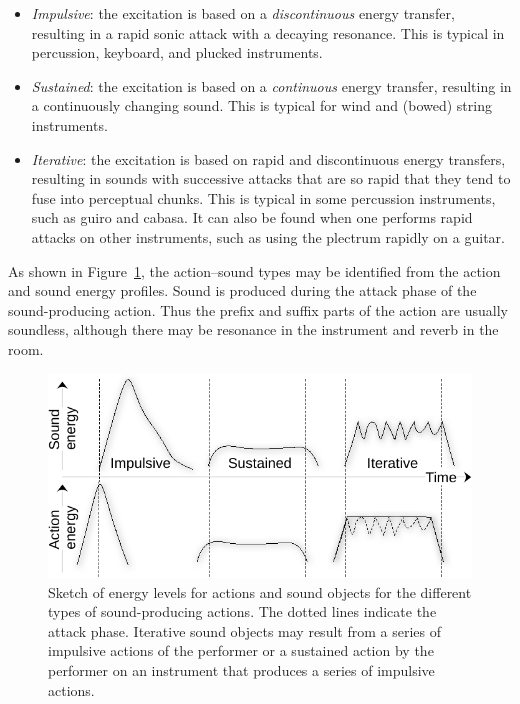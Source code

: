 \begin{itemize}
      \item \emph{Impulsive}: the excitation is based on a \emph{discontinuous} energy transfer, resulting in a rapid sonic attack with a decaying resonance. This is typical in percussion, keyboard, and plucked instruments.
      \item \emph{Sustained}: the excitation is based on a \emph{continuous} energy transfer, resulting in a continuously changing sound. This is typical for wind and (bowed) string instruments.
      \item \emph{Iterative}: the excitation is based on rapid and discontinuous energy transfers, resulting in sounds with successive attacks that are so rapid that they tend to fuse into perceptual chunks. This is typical in some percussion instruments, such as guiro and cabasa. It can also be found when one performs rapid attacks on other instruments, such as using the plectrum rapidly on a guitar.
\end{itemize}

As shown in Figure~\ref{fig:action--sound-time},  the action–sound types may be identified from the action and sound energy profiles. Sound is produced during the attack phase of the sound-producing action. Thus the prefix and suffix parts of the action are usually soundless, although there may be resonance in the instrument and reverb in the room.

\begin{figure}[tbp]
      \includegraphics[width=1\textwidth]{figures/27-impulsive-sustained-crop.pdf}
\caption{Sketch of energy levels for actions and sound objects for the different types of sound-producing actions. The dotted lines indicate the attack phase. Iterative sound objects may result from a series of impulsive actions of the performer or a sustained action by the performer on an instrument that produces a series of impulsive actions.}
\label{fig:action--sound-time}
\end{figure}

